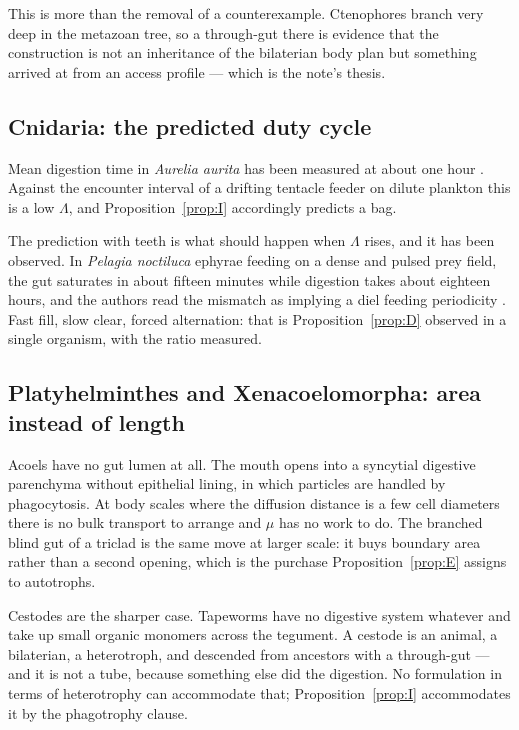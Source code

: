 \documentclass[11pt]{article}
\theoremstyle{plain}
\theoremstyle{definition}
\begin{document}
This is more than the removal of a counterexample. Ctenophores branch very deep in the metazoan tree,
so a through-gut there is evidence that the construction is not an inheritance of the bilaterian body
plan but something arrived at from an access profile --- which is the note's thesis.

\subsection{Cnidaria: the predicted duty cycle}

Mean digestion time in \emph{Aurelia aurita} has been measured at about one hour
\cite{ishii2001}. Against the encounter interval of a drifting tentacle feeder on dilute plankton this
is a low $\Lambda$, and Proposition~\ref{prop:I} accordingly predicts a bag.

The prediction with teeth is what should happen when $\Lambda$ rises, and it has been observed. In
\emph{Pelagia noctiluca} ephyrae feeding on a dense and pulsed prey field, the gut saturates in about
fifteen minutes while digestion takes about eighteen hours, and the authors read the mismatch as
implying a diel feeding periodicity \cite{gordoa2013}. Fast fill, slow clear, forced alternation: that
is Proposition~\ref{prop:D} observed in a single organism, with the ratio measured.

\subsection{Platyhelminthes and Xenacoelomorpha: area instead of length}

Acoels have no gut lumen at all. The mouth opens into a syncytial digestive parenchyma without
epithelial lining, in which particles are handled by phagocytosis. At body scales where the diffusion
distance is a few cell diameters there is no bulk transport to arrange and $\mu$ has no work to do.
The branched blind gut of a triclad is the same move at larger scale: it buys boundary area rather
than a second opening, which is the purchase Proposition~\ref{prop:E} assigns to autotrophs.

Cestodes are the sharper case. Tapeworms have no digestive system whatever and take up small organic
monomers across the tegument. A cestode is an animal, a bilaterian, a heterotroph, and descended from
ancestors with a through-gut --- and it is not a tube, because something else did the digestion. No
formulation in terms of heterotrophy can accommodate that; Proposition~\ref{prop:I} accommodates it
by the phagotrophy clause.
\end{document}

